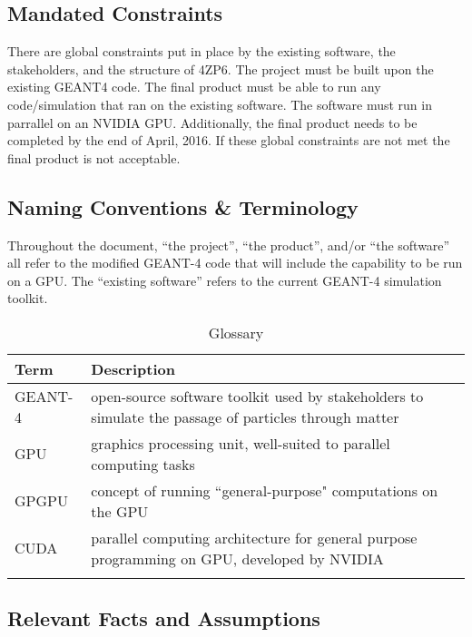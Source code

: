 \documentclass[12pt]{article}
\begin{document}
\subsection{Mandated Constraints} %
There are global constraints put in place by the existing software, the stakeholders, and the structure of 4ZP6. The project must be built upon the existing GEANT4 code. The final product must be able to run any code/simulation that ran on the existing software. The software must run in parrallel on an NVIDIA GPU. Additionally, the final product needs to be completed by the end of April, 2016. If these global constraints are not met the final product is not acceptable.\\

\subsection{Naming Conventions \& Terminology} %
Throughout the document, ``the project'', ``the product'', and/or ``the software'' all refer to the modified GEANT-4 code that will include the capability to be run on a GPU. The ``existing software'' refers to the current GEANT-4 simulation toolkit.\\
\begin{table}[h]
\centering
\caption{Glossary}
\begin{tabularx}{\textwidth}{l|X}
\Xhline{2\arrayrulewidth}
\bf Term & \bf Description\\
\hline
GEANT-4 & open-source software toolkit used by stakeholders to simulate the passage of particles through matter\\
GPU & graphics processing unit, well-suited to parallel computing tasks\\
GPGPU & concept of running ``general-purpose" computations on the GPU\\
CUDA & parallel computing architecture for general purpose programming on GPU, developed by NVIDIA\\
\Xhline{2\arrayrulewidth}
\end{tabularx}
\end{table}

\subsection{Relevant Facts and Assumptions} %
\end{document}
